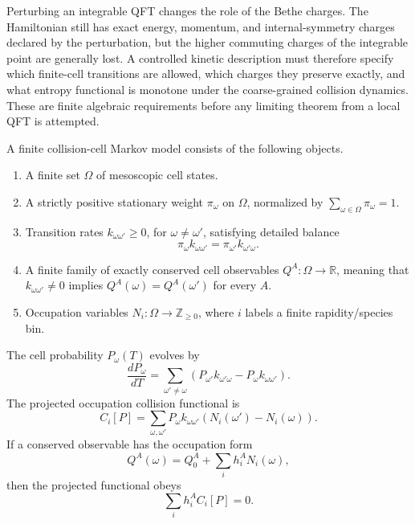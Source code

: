 Perturbing an integrable QFT changes the role of the Bethe charges.  The
Hamiltonian still has exact energy, momentum, and internal-symmetry charges
declared by the perturbation, but the higher commuting charges of the
integrable point are generally lost.  A controlled kinetic description must
therefore specify which finite-cell transitions are allowed, which charges
they preserve exactly, and what entropy functional is monotone under the
coarse-grained collision dynamics.  These are finite algebraic requirements
before any limiting theorem from a local QFT is attempted.

\begin{definition}
\label{def:finite-collision-cell-datum}
A finite collision-cell Markov model consists of the following objects.

\begin{enumerate}
\item A finite set \(\Omega\) of mesoscopic cell states.
\item A strictly positive stationary weight \(\pi_\omega\) on \(\Omega\),
  normalized by \(\sum_{\omega\in\Omega}\pi_\omega=1\).
\item Transition rates \(k_{\omega\omega'}\ge0\), for
  \(\omega\ne\omega'\), satisfying detailed balance
  \begin{equation}
    \pi_\omega k_{\omega\omega'}
    =
    \pi_{\omega'} k_{\omega'\omega}.
    \label{eq:collision-cell-detailed-balance}
  \end{equation}
\item A finite family of exactly conserved cell observables
  \(Q^A:\Omega\to\mathbb R\), meaning that
  \(k_{\omega\omega'}\ne0\) implies \(Q^A(\omega)=Q^A(\omega')\) for every
  \(A\).
\item Occupation variables \(N_i:\Omega\to\mathbb Z_{\ge0}\), where \(i\)
  labels a finite rapidity/species bin.
\end{enumerate}

The cell probability \(P_\omega(T)\) evolves by
\begin{equation}
  \frac{dP_\omega}{dT}
  =
  \sum_{\omega'\ne\omega}
  \left(
    P_{\omega'}k_{\omega'\omega}
    -
    P_\omega k_{\omega\omega'}
  \right).
  \label{eq:collision-cell-master-equation}
\end{equation}
The projected occupation collision functional is
\begin{equation}
  C_i[P]
  =
  \sum_{\omega,\omega'}
  P_\omega k_{\omega\omega'}
  \left(N_i(\omega')-N_i(\omega)\right).
  \label{eq:collision-cell-projected-functional}
\end{equation}
If a conserved observable has the occupation form
\[
  Q^A(\omega)=Q^A_0+\sum_i h_i^A N_i(\omega),
\]
then the projected functional obeys
\begin{equation}
  \sum_i h_i^A C_i[P]=0 .
  \label{eq:collision-cell-projected-conservation}
\end{equation}
\end{definition}

